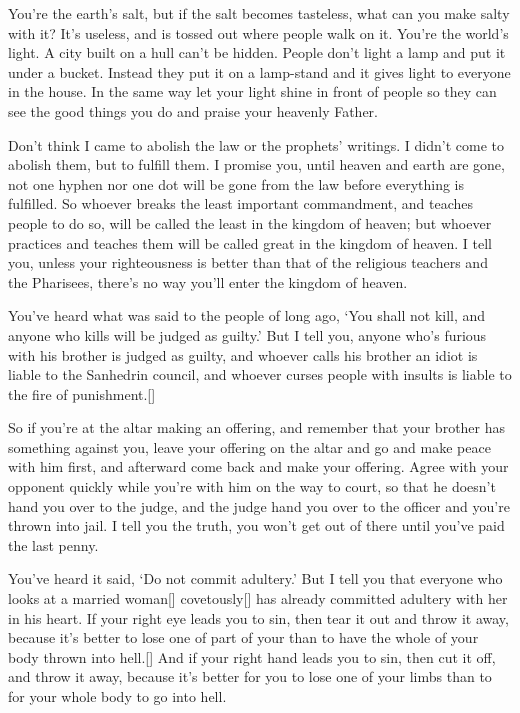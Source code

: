 \documentclass[a4paper]{amsbook}
\begin{document}
You're the earth's salt, but if the salt becomes tasteless, what can you make salty with it? It's useless, and is tossed out where people walk on it. You're the world's light. A city built on a hull can't be hidden. People don't light a lamp and put it under a bucket. Instead they put it on a lamp-stand and it gives light to everyone in the house. In the same way let your light shine in front of people so they can see the good things you do and praise your heavenly Father.

Don't think I came to abolish the law or the prophets' writings. I didn't come to abolish them, but to fulfill them. I promise you, until heaven and earth are gone, not one hyphen nor one dot will be gone from the law before everything is fulfilled. So whoever breaks the least important commandment, and teaches people to do so, will be called the least in the kingdom of heaven; but whoever practices and teaches them will be called great in the kingdom of heaven. I tell you, unless your righteousness is better than that of the religious teachers and the Pharisees, there's no way you'll enter the kingdom of heaven.

You've heard what was said to the people of long ago, ‘You shall not kill, and anyone who kills will be judged as guilty.' But I tell you, anyone who's furious with his brother is judged as guilty, and whoever calls his brother an idiot is liable to the Sanhedrin council, and whoever curses people with insults is liable to the fire of punishment.[]

So if you're at the altar making an offering, and remember that your brother has something against you, leave your offering on the altar and go and make peace with him first, and afterward come back and make your offering. Agree with your opponent quickly while you're with him on the way to court, so that he doesn't hand you over to the judge, and the judge hand you over to the officer and you're thrown into jail. I tell you the truth, you won't get out of there until you've paid the last penny.

You've heard it said, ‘Do not commit adultery.' But I tell you that everyone who looks at a married woman[] covetously[] has already committed adultery with her in his heart. If your right eye leads you to sin, then tear it out and throw it away, because it's better to lose one of part of your than to have the whole of your body thrown into hell.[] And if your right hand leads you to sin, then cut it off, and throw it away, because it's better for you to lose one of your limbs than to for your whole body to go into hell.
\end{document}
